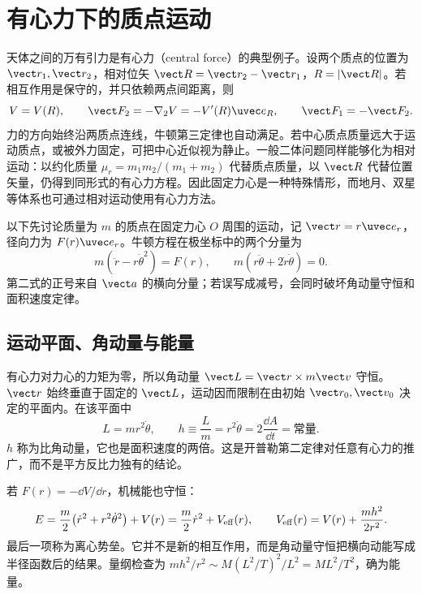 \section{有心力下的质点运动}
\label{r2ch05:sec:central}

天体之间的万有引力是有心力（central force）的典型例子。设两个质点的位置为 $\vect r_1,\vect r_2$，相对位矢 $\vect R=\vect r_2-\vect r_1$，$R=|\vect R|$。若相互作用是保守的，并只依赖两点间距离，则
\begin{equation}
 V=V(R),\qquad
 \vect F_2=-\nabla_2V=-V'(R)\uvec e_R,\qquad
 \vect F_1=-\vect F_2.
 \label{r2ch05:eq:001}
\end{equation}
力的方向始终沿两质点连线，牛顿第三定律也自动满足。若中心质点质量远大于运动质点，或被外力固定，可把中心近似视为静止。一般二体问题同样能够化为相对运动：以约化质量 $\mu_r=m_1m_2/(m_1+m_2)$ 代替质点质量，以 $\vect R$ 代替位置矢量，仍得到同形式的有心力方程。因此固定力心是一种特殊情形，而地月、双星等体系也可通过相对运动使用有心力方法。

以下先讨论质量为 $m$ 的质点在固定力心 $O$ 周围的运动，记 $\vect r=r\uvec e_r$，径向力为 $F(r)\uvec e_r$。牛顿方程在极坐标中的两个分量为
\begin{equation}
 m(\ddot r-r\dot\theta^2)=F(r),\qquad
 m(r\ddot\theta+2\dot r\dot\theta)=0.
 \label{r2ch05:eq:002}
\end{equation}
第二式的正号来自 $\vect a$ 的横向分量；若误写成减号，会同时破坏角动量守恒和面积速度定律。

\subsection{运动平面、角动量与能量}
\label{r2ch05:sec:invariants}

有心力对力心的力矩为零，所以角动量 $\vect L=\vect r\times m\vect v$ 守恒。$\vect r$ 始终垂直于固定的 $\vect L$，运动因而限制在由初始 $\vect r_0,\vect v_0$ 决定的平面内。在该平面中
\begin{equation}
 L=mr^2\dot\theta,\qquad
 h\equiv\frac Lm=r^2\dot\theta=2\frac{\dd A}{\dd t}=\text{常量}.
 \label{r2ch05:eq:003}
\end{equation}
$h$ 称为比角动量，它也是面积速度的两倍。这是开普勒第二定律对任意有心力的推广，而不是平方反比力独有的结论。

若 $F(r)=-\dd V/\dd r$，机械能也守恒：
\begin{equation}
 E=\frac m2\bigl(\dot r^2+r^2\dot\theta^2\bigr)+V(r)
   =\frac m2\dot r^2+V_{\rm eff}(r),\qquad
 V_{\rm eff}(r)=V(r)+\frac{mh^2}{2r^2}.
 \label{r2ch05:eq:004}
\end{equation}
最后一项称为离心势垒。它并不是新的相互作用，而是角动量守恒把横向动能写成半径函数后的结果。量纲检查为 $mh^2/r^2\sim M(L^2/T)^2/L^2=ML^2/T^2$，确为能量。

